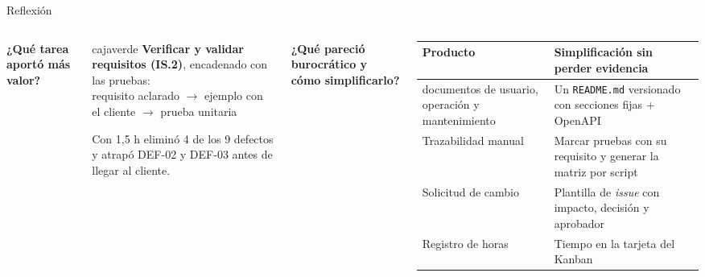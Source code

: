 \documentclass[aspectratio=169,11pt]{beamer}
\newcommand{\cod}[1]{\texttt{\small #1}}
\newcommand{\caja}[3]{\begin{beamercolorbox}[wd=\dimexpr\linewidth-12pt\relax,sep=6pt,rounded=true]{#1}#3\end{beamercolorbox}}
\begin{document}
\begin{frame}{Reflexión}
\begin{columns}[T,onlytextwidth]
\textbf{¿Qué tarea aportó más valor?}\\[0.1cm]
\caja{cajaverde}{}{\small
\textbf{Verificar y validar requisitos (IS.2)}, encadenado con las pruebas:\\[0.15cm]
\centering\footnotesize requisito aclarado $\rightarrow$ ejemplo con el cliente $\rightarrow$ prueba unitaria\\[0.15cm]
\raggedright Con 1,5 h eliminó 4 de los 9 defectos y atrapó DEF-02 y DEF-03 antes de llegar al cliente.}
\textbf{¿Qué pareció burocrático y cómo simplificarlo?}\\[0.1cm]
\scriptsize
\begin{tabularx}{\linewidth}{@{}>{\raggedright\arraybackslash}p{2.3cm} L@{}}
\toprule
\textbf{Producto} & \textbf{Simplificación sin perder evidencia} \\
 documentos de usuario, operación y mantenimiento & Un \cod{README.md} versionado con secciones fijas + OpenAPI \\
Trazabilidad manual & Marcar pruebas con su requisito y generar la matriz por script \\
Solicitud de cambio & Plantilla de \emph{issue} con impacto, decisión y aprobador \\
Registro de horas & Tiempo en la tarjeta del Kanban \\
\bottomrule
\end{tabularx}
\end{columns}
\vspace{0.25cm}
\end{frame}
\end{document}
